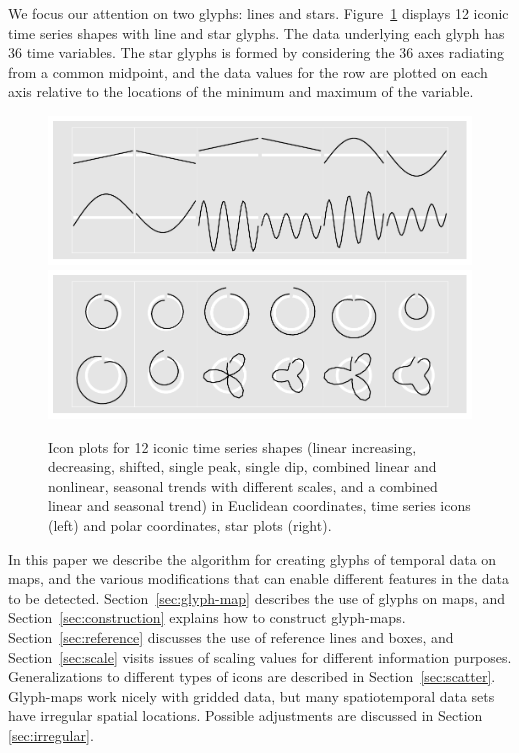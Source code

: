 \documentclass[oneside]{article}
\begin{document}
We focus our attention on two glyphs: lines and stars. Figure~\ref{fig:templates} displays 12 iconic time series shapes with line and star glyphs. The data underlying each glyph has 36 time variables. The star glyphs is formed by considering the 36 axes radiating from a common midpoint, and the data values for the row are plotted on each axis relative to the locations of the minimum and maximum of the variable.

\begin{figure}[htbp]
  \centering
  \includegraphics[width=0.5\linewidth]{euclid-to-polar-1}%
  \includegraphics[width=0.5\linewidth]{euclid-to-polar-2}

  \caption{Icon plots for 12 iconic time series shapes (linear increasing, decreasing, shifted, single peak, single dip, combined linear and nonlinear, seasonal trends with different scales, and a combined linear and seasonal trend) in Euclidean coordinates, time series icons (left) and polar coordinates, star plots (right).}
  \label{fig:templates}
\end{figure}



In this paper we describe the algorithm for creating glyphs of temporal data on maps, and the various modifications that can enable different features in the data to be detected. Section~\ref{sec:glyph-map} describes the use of glyphs on maps, and Section~\ref{sec:construction} explains how to construct glyph-maps. Section~\ref{sec:reference} discusses the use of reference lines and boxes, and Section~\ref{sec:scale} visits issues of scaling values for different information purposes. Generalizations to different types of icons are described in Section~\ref{sec:scatter}. Glyph-maps work nicely with gridded data, but many spatiotemporal data sets have irregular spatial locations. Possible adjustments are discussed in Section \ref{sec:irregular}. 
\end{document}
